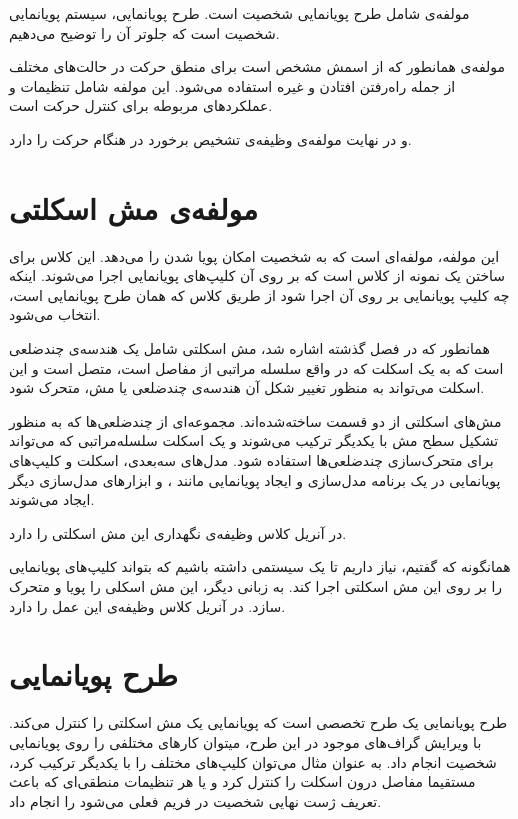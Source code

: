 مولفه‌ی 
شامل طرح پویانمایی شخصیت است. طرح پویانمایی، سیستم پویانمایی شخصیت است که جلوتر آن را توضیح می‌دهیم.


مولفه‌ی 
همانطور که از اسمش مشخص است برای منطق حرکت در حالت‌های مختلف از جمله راه‌رفتن افتادن و غیره استفاده می‌شود.
این مولفه شامل تنظیمات و عملکرد‌های مربوطه برای کنترل حرکت است.

و در نهایت مولفه‌‌ی
وظیفه‌ی تشخیص برخورد در هنگام حرکت را دارد.


\section{مولفه‌ی مش اسکلتی}

این مولفه‌، مولفه‌ای است که به شخصیت امکان پویا شدن را می‌دهد.
این کلاس برای ساختن یک نمونه از کلاس 
است که بر روی آن کلیپ‌های پویانمایی اجرا می‌شوند.
اینکه چه کلیپ پویانمایی بر روی آن اجرا شود از طریق کلاس 
که همان طرح پویانمایی
 است، انتخاب می‌شود.

همانطور که در فصل گذشته اشاره شد، مش اسکلتی 
شامل یک هندسه‌ی چندضلعی است که به یک اسکلت که در واقع 
سلسله مراتبی از مفاصل است، متصل است و این اسکلت می‌تواند به 
منظور تغییر شکل آن هندسه‌ی چندضلعی یا مش، متحرک شود.

مش‌های اسکلتی از دو قسمت ساخته‌شده‌اند. مجموعه‌ای از چندضلعی‌ها
که به منظور تشکیل سطح مش با یکدیگر ترکیب می‌شوند و 
یک اسکلت سلسله‌مراتبی که می‌تواند برای متحرک‌سازی چند‌ضلعی‌ها استفاده شود.
مدل‌های سه‌بعدی، 
اسکلت
و کلیپ‌های پویانمایی 
در یک برنامه مدل‌سازی و ایجاد پویانمایی
مانند 
،
و ابزار‌های مدل‌سازی دیگر ایجاد می‌شوند.

در آنریل کلاس 
وظیفه‌ی نگهداری این مش اسکلتی را دارد.

همانگونه که گفتیم، نیاز داریم تا یک سیستمی داشته باشیم 
که بتواند کلیپ‌های پویانمایی را بر روی 
این مش اسکلتی اجرا کند. به زبانی دیگر، این 
مش اسکلی را پویا و متحرک سازد.
در آنریل کلاس 
وظیفه‌ی این عمل را دارد.

\section{طرح پویانمایی}
طرح پویانمایی یک طرح تخصصی است که پویانمایی 
یک مش اسکلتی را کنترل می‌کند.
با ویرایش گراف‌های موجود در این طرح، 
میتوان کار‌های مختلفی را روی پویانمایی شخصیت انجام داد.
به عنوان مثال می‌توان کلیپ‌های مختلف را با یکدیگر ترکیب کرد،
مستقیما مفاصل درون اسکلت را کنترل کرد و
یا هر تنظیمات منطقی‌ای که باعث تعریف 
ژست نهایی شخصیت در فریم فعلی می‌شود را انجام داد.

